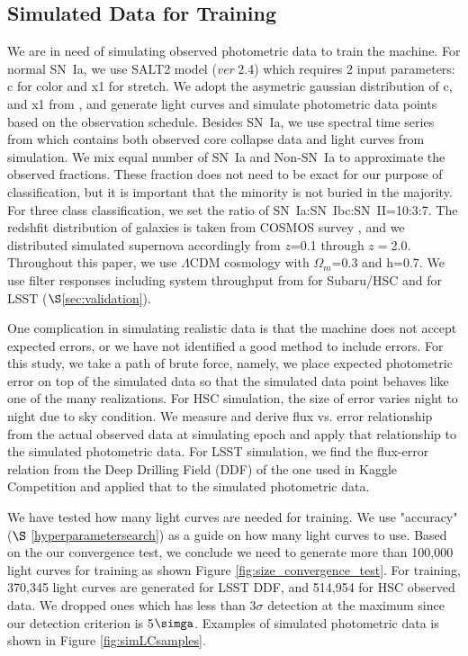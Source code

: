 \documentclass[useamsfonts]{pasj01}
\begin{document}
\subsection{Simulated Data for Training}
\label{sec:training}
We are in need of simulating observed photometric data to train the machine.  
For normal SN~Ia, we use SALT2 \citep{guy10b} model ({\it ver} 2.4) which requires 2 input parameters:
c for color and x1 for stretch.
We adopt the asymetric gaussian distribution of c, and x1 from \citet{mosher14a}, and generate
light curves and simulate photometric data points based on the observation schedule. 
Besides SN~Ia, we use spectral time series from \citet{kessler19b} which contains both observed
core collapse data and light curves from simulation.
We mix equal number of SN~Ia and Non-SN~Ia to approximate the observed fractions. 
These fraction does not need to be exact for our purpose of classification, but it is important
that the minority is not buried in the majority.
For three class classification, we set the ratio of SN~Ia:SN~Ibc:SN~II=10:3:7.
The redshfit distribution of galaxies is taken from COSMOS survey \citep{laigle16a}, and we distributed
simulated supernova accordingly from $z$=0.1 through $z=$2.0.
Throughout this paper, we use $\Lambda$CDM cosmology with $\Omega_{m}$=0.3 and h=0.7.
We use filter responses including system throughput from \citet{kawanomoto18a} for Subaru/HSC and
\citet{ivezic19a} for LSST ($\S$\ref{sec:validation}). 

One complication in simulating realistic data is that the machine does not accept expected errors,
or we have not identified a good method to include errors.   
For this study, we take a path of brute force, namely, we place expected photometric error on top 
of the simulated data so that the simulated data point behaves like one of the many realizations.
For HSC simulation, the size of error varies night to night due to sky condition. 
We measure and derive flux vs. error relationship from the actual observed data at simulating epoch 
and apply that relationship to the simulated photometric data.
For LSST simulation, we find the flux-error relation from the Deep Drilling Field (DDF) of the one
used in Kaggle Competition \citep{malz19a} and applied that to the simulated photometric data.

We have tested how many light curves are needed for training.  We use "accuracy" ($\S$ \ref{hyperparametersearch}) 
as a guide on how many light curves to use.  
Based on the our convergence test, we conclude we need to generate more than 100,000 light curves 
for training as shown Figure \ref{fig:size_convergence_test}.
For training, 370,345 light curves are generated for LSST DDF, and 514,954 for HSC observed data.
We dropped ones which has less than 3$\sigma$ detection at the maximum since our detection criterion
is 5$\simga$.  %
Examples of simulated photometric data is shown in Figure \ref{fig:simLCsamples}.
\end{document}
